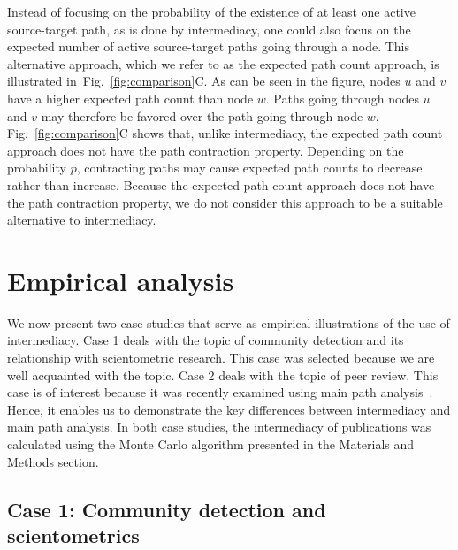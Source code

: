 \documentclass[9pt,twocolumn,twoside]{pnas-alt} %
\theoremstyle{definition}
\newcommand{\subfigref}[2]{Fig.~\ref{fig:#1}#2\xspace}
\begin{document}
Instead of focusing on the probability of the existence of at least one active source-target path, as is done by intermediacy, one could also focus on the expected number of active source-target paths going through a node. This alternative approach, which we refer to as the expected path count approach, is illustrated in~\subfigref{comparison}{C}. As can be seen in the figure, nodes $u$ and $v$ have a higher expected path count than node $w$. Paths going through nodes $u$ and $v$ may therefore be favored over the path going through node $w$. \subfigref{comparison}{C} shows that, unlike intermediacy, the expected path count approach does not have the path contraction property. Depending on the probability $p$, contracting paths may cause expected path counts to decrease rather than increase. Because the expected path count approach does not have the path contraction property, we do not consider this approach to be a suitable alternative to intermediacy.

%
%

\section*{\label{sec:empirical}Empirical analysis}

We now present two case studies that serve as empirical illustrations of the use of intermediacy. Case 1 deals with the topic of community detection and its relationship with scientometric research. This case was selected because we are well acquainted with the topic. Case 2 deals with the topic of peer review. This case is of interest because it was recently examined using main path analysis~\cite{Batagelj2017}. Hence, it enables us to demonstrate the key differences between intermediacy and main path analysis. In both case studies, the intermediacy of publications was calculated using the Monte Carlo algorithm presented in the Materials and Methods section.

%
%

\subsection*{\label{sec:Q}Case 1: Community detection and scientometrics}
\end{document}
